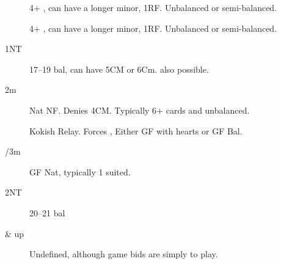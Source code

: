\documentclass[tom-ari]{subfile}
\begin{document}
	
	\begin{description}
		\item[] 4+ \heartsuit, can have a longer minor, 1RF.  Unbalanced or semi-balanced.
		\item[] 4+ \spadesuit, can have a longer minor, 1RF.  Unbalanced or semi-balanced.
		\item[1NT] 17--19 bal, can have 5CM or 6Cm.   also possible.
		\item[2m] Nat NF.  Denies 4CM.  Typically 6+ cards and unbalanced.
		\item[] Kokish Relay.  Forces , Either GF with hearts or GF Bal.
		\item[/3m] GF Nat, typically 1 suited.
		\item[2NT] 20--21 bal
		\item[ \& up] Undefined, although game bids are simply to play.

	\end{description}
	
\end{document}
